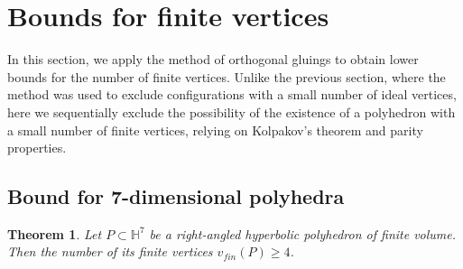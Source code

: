 \documentclass[12pt]{amsart}
\newtheorem{theorem}{Theorem}[section]
\theoremstyle{definition}
\begin{document}
	\section{Bounds for finite vertices}
	
	In this section, we apply the method of orthogonal gluings to obtain lower bounds for the number of finite vertices. Unlike the previous section, where the method was used to exclude configurations with a small number of ideal vertices, here we sequentially exclude the possibility of the existence of a polyhedron with a small number of finite vertices, relying on Kolpakov's theorem and parity properties.
	
	\subsection{Bound for 7-dimensional polyhedra}
	
	\begin{theorem} \label{thm:dim7_fin}
		Let $P \subset \mathbb{H}^7$ be a right-angled hyperbolic polyhedron of finite volume. Then the number of its finite vertices $v_{fin}(P) \ge 4$.
	\end{theorem}
	
\end{document}
